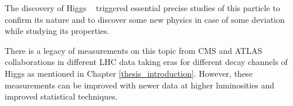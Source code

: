 \par The discovery of Higgs ~\cite{Reference20,Reference21} triggered essential precise studies of this particle to confirm its nature and to discover some new physics in case of some deviation while studying its properties.

%
%
There is a legacy of measurements on this topic from CMS and ATLAS collaborations in different LHC data taking eras for different decay channels of Higgs as mentioned in Chapter \ref{thesis_introduction}. However, these measurements can be improved with newer data at higher luminosities and improved statistical techniques.  

